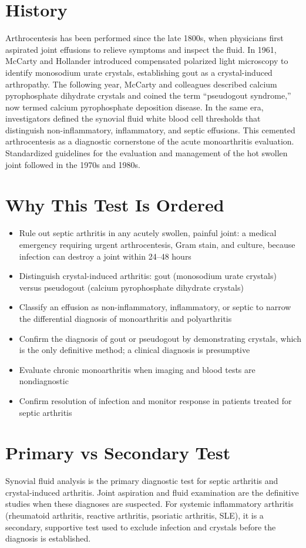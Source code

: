 \section*{History}
Arthrocentesis has been performed since the late 1800s, when physicians first aspirated joint effusions to relieve symptoms and inspect the fluid. In 1961, McCarty and Hollander introduced compensated polarized light microscopy to identify monosodium urate crystals, establishing gout as a crystal-induced arthropathy. The following year, McCarty and colleagues described calcium pyrophosphate dihydrate crystals and coined the term ``pseudogout syndrome,'' now termed calcium pyrophosphate deposition disease. In the same era, investigators defined the synovial fluid white blood cell thresholds that distinguish non-inflammatory, inflammatory, and septic effusions. This cemented arthrocentesis as a diagnostic cornerstone of the acute monoarthritis evaluation. Standardized guidelines for the evaluation and management of the hot swollen joint followed in the 1970s and 1980s.
\section*{Why This Test Is Ordered}
\begin{itemize}
  \item Rule out septic arthritis in any acutely swollen, painful joint: a medical emergency requiring urgent arthrocentesis, Gram stain, and culture, because infection can destroy a joint within 24--48 hours
  \item Distinguish crystal-induced arthritis: gout (monosodium urate crystals) versus pseudogout (calcium pyrophosphate dihydrate crystals)
  \item Classify an effusion as non-inflammatory, inflammatory, or septic to narrow the differential diagnosis of monoarthritis and polyarthritis
  \item Confirm the diagnosis of gout or pseudogout by demonstrating crystals, which is the only definitive method; a clinical diagnosis is presumptive
  \item Evaluate chronic monoarthritis when imaging and blood tests are nondiagnostic
  \item Confirm resolution of infection and monitor response in patients treated for septic arthritis
\end{itemize}
\section*{Primary vs Secondary Test}
Synovial fluid analysis is the primary diagnostic test for septic arthritis and crystal-induced arthritis. Joint aspiration and fluid examination are the definitive studies when these diagnoses are suspected. For systemic inflammatory arthritis (rheumatoid arthritis, reactive arthritis, psoriatic arthritis, SLE), it is a secondary, supportive test used to exclude infection and crystals before the diagnosis is established.
